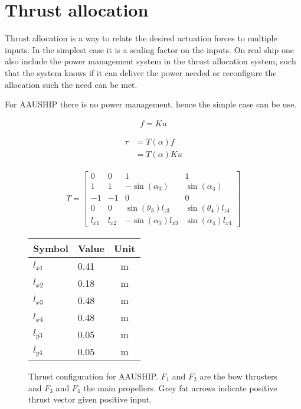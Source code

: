 \section{Thrust allocation}

Thrust allocation is a way to relate the desired actuation forces to multiple inputs. In the simplest case it is a scaling factor on the inputs. On real ship one also include the power management system in the thrust allocation system, such that the system knows if it can deliver the power needed or reconfigure the allocation such the need can be met.

For AAUSHIP there is no power management, hence the simple case can be use.

\begin{align}
f  = K u
\label{eq:fKu}
\end{align}

\begin{subequations}
\begin{align}
 \tau &=  T ( \alpha)  f\\
&=  T (  \alpha)  K  u
\end{align}
\end{subequations}

\begin{align}
T =
\begin{bmatrix}
0 & 0 & 1 & 1\\
1 & 1 & -\sin(\alpha_3) & \sin(\alpha_4)\\
-1 & -1 & 0 & 0\\
0 & 0 & \sin(\theta_3) l_{z3} & \sin(\theta_4)l_{z4} \\
l_{x1} & l_{x2} & -\sin(\alpha_3) l_{x3} & \sin(\alpha_4) l_{x4}
\end{bmatrix}
\end{align}
\citep{mss}

\begin{figure}[htbp]
	\centering
	\begin{minipage}[l]{0.3\textwidth}
		\begin{tabular}{llc}
		\toprule
		Symbol & Value & Unit\\
		\midrule
		$l_{x1}$& 0.41 & m\\
		$l_{x2}$& 0.18 & m\\
		$l_{x3}$& 0.48 & m\\
		$l_{x4}$& 0.48 & m\\
		$l_{y3}$& 0.05 & m\\
		$l_{y4}$& 0.05 & m\\
		\bottomrule
		\end{tabular}
	\end{minipage}%
\noindent
	\begin{minipage}[l]{0.7\textwidth}
		
	\end{minipage}
	\caption{Thrust configuration for AAUSHIP. $F_1$ and $F_2$ are the
	bow thrusters and $F_3$ and $F_4$ the main propellers. Grey fat
arrows indicate positive thrust vector given positive input.} 
	\label{fig:thrust_allocation}
\end{figure}

